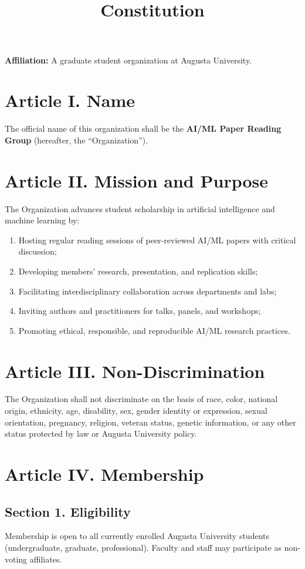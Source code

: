 \documentclass[12pt]{article}
\title{\orgname\\Constitution}
\date{\foundingdate}
\newcommand{\orgname}{AI/ML Paper Reading Group} %
\newcommand{\university}{Augusta University}
\begin{document}
\maketitle
\thispagestyle{empty}
\vspace{-1em}
\noindent\textbf{Affiliation:} A graduate student organization at \university.

\newpage
\setcounter{page}{1}

\section*{Article I. Name}
The official name of this organization shall be the \textbf{\orgname} (hereafter, the ``Organization'').

\section*{Article II. Mission and Purpose}
The Organization advances student scholarship in artificial intelligence and machine learning by:
\begin{enumerate}[label=\alph*)]
    \item Hosting regular reading sessions of peer-reviewed AI/ML papers with critical discussion;
    \item Developing members’ research, presentation, and replication skills;
    \item Facilitating interdisciplinary collaboration across departments and labs;
    \item Inviting authors and practitioners for talks, panels, and workshops;
    \item Promoting ethical, responsible, and reproducible AI/ML research practices.
\end{enumerate}

\section*{Article III. Non-Discrimination}
The Organization shall not discriminate on the basis of race, color, national origin, ethnicity, age, disability, sex, gender identity or expression, sexual orientation, pregnancy, religion, veteran status, genetic information, or any other status protected by law or \university{} policy.

\section*{Article IV. Membership}
\subsection*{Section 1. Eligibility}
Membership is open to all currently enrolled \university{} students (undergraduate, graduate, professional). Faculty and staff may participate as non-voting affiliates.
\end{document}
